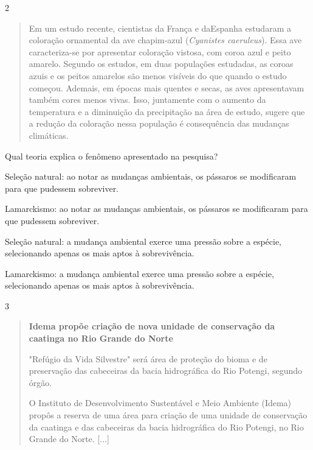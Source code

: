 \num{2}

\begin{quote}
Em um estudo recente, cientistas da França e daEspanha estudaram a
  coloração ornamental da ave chapim-azul (\emph{Cyanistes caeruleus}).
 Essa ave caracteriza-se por apresentar coloração vistosa, com coroa azul e peito amarelo.
Segundo os estudos, em duas populações estudadas, as coroas azuis e os peitos amarelos
  são menos visíveis do que quando o estudo começou. Ademais, em épocas mais quentes e secas, as aves apresentavam também cores menos
  vivas. Isso, juntamente com o aumento da
  temperatura e a diminuição da precipitação na área de estudo, sugere que
  a redução da coloração nessa população é consequência das mudanças climáticas.

\end{quote}

Qual teoria explica o fenômeno apresentado na pesquisa?

\begin{escolha}
\item
  Seleção natural: ao notar as mudanças ambientais, os pássaros se
  modificaram para que pudessem sobreviver.
\item
  Lamarckismo: ao notar as mudanças ambientais, os pássaros se
  modificaram para que pudessem sobreviver.
\item
  Seleção natural: a mudança ambiental exerce uma pressão sobre a
  espécie, selecionando apenas os mais aptos à sobrevivência.
\item
  Lamarckismo: a mudança ambiental exerce uma pressão sobre a espécie,
  selecionando apenas os mais aptos à sobrevivência.
\end{escolha}

\num{3}

\begin{quote}
\textbf{Idema propõe criação de nova unidade de conservação da caatinga no Rio
Grande do Norte}

"Refúgio da Vida Silvestre" será área de proteção do bioma e de
preservação das cabeceiras da bacia hidrográfica do Rio Potengi, segundo
órgão.

O Instituto de Desenvolvimento Sustentável e Meio Ambiente (Idema)
propôs a reserva de uma área para criação de uma unidade de conservação
da caatinga e das cabeceiras da bacia hidrográfica do Rio Potengi, no
Rio Grande do Norte. [...]

\end{quote}

